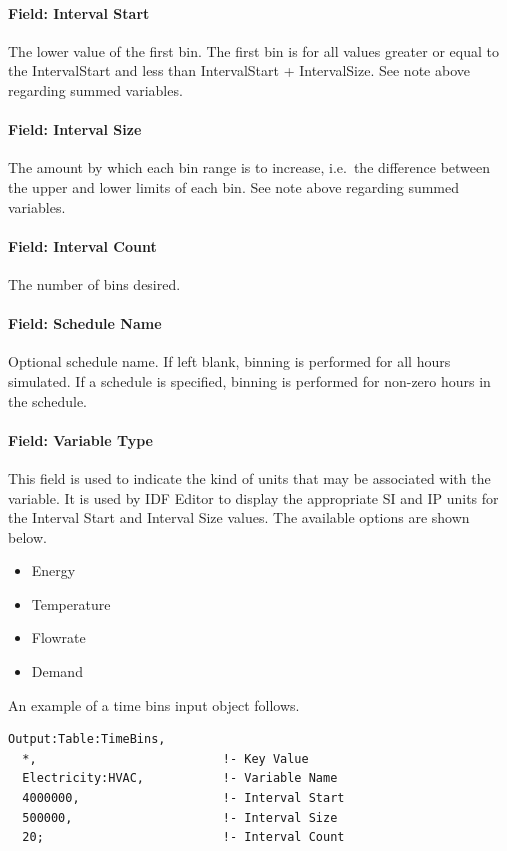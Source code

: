 \paragraph{Field: Interval Start}\label{field-interval-start}

The lower value of the first bin. The first bin is for all values greater or equal to the IntervalStart and less than IntervalStart + IntervalSize. See note above regarding summed variables.

\paragraph{Field: Interval Size}\label{field-interval-size}

The amount by which each bin range is to increase, i.e.~the difference between the upper and lower limits of each bin. See note above regarding summed variables.

\paragraph{Field: Interval Count}\label{field-interval-count}

The number of bins desired.

\paragraph{Field: Schedule Name}\label{field-schedule-name-009}

Optional schedule name. If left blank, binning is performed for all hours simulated. If a schedule is specified, binning is performed for non-zero hours in the schedule.

\paragraph{Field: Variable Type}\label{field-variable-type}

This field is used to indicate the kind of units that may be associated with the variable. It is used by IDF Editor to display the appropriate SI and IP units for the Interval Start and Interval Size values. The available options are shown below.

\begin{itemize}
\item
  Energy
\item
  Temperature
\item
  Flowrate
\item
  Demand
\end{itemize}

An example of a time bins input object follows.

\begin{lstlisting}
Output:Table:TimeBins,
  *,                          !- Key Value
  Electricity:HVAC,           !- Variable Name
  4000000,                    !- Interval Start
  500000,                     !- Interval Size
  20;                         !- Interval Count
\end{lstlisting}
